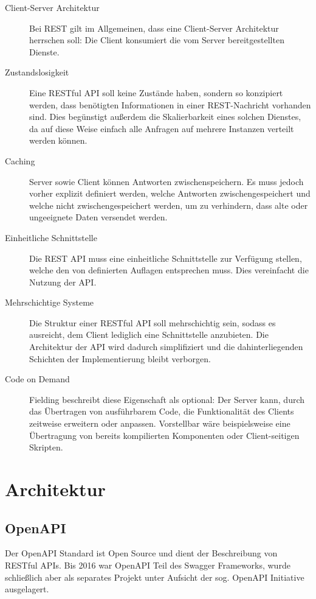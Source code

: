 		\begin{description}
			\item[Client-Server Architektur] 
				Bei REST gilt im Allgemeinen, dass eine Client-Server Architektur herrschen soll: Die Client konsumiert die vom Server bereitgestellten Dienste. 
			\item[Zustandslosigkeit] 
				Eine RESTful API soll keine Zustände haben, sondern so konzipiert werden, dass benötigten Informationen in einer REST-Nachricht vorhanden sind. Dies begünstigt außerdem die Skalierbarkeit eines solchen Dienstes, da auf diese Weise einfach alle Anfragen auf mehrere Instanzen verteilt werden können.
			\item[Caching] 
				Server sowie Client können Antworten zwischenspeichern. Es muss jedoch vorher explizit definiert werden, welche Antworten zwischengespeichert und welche nicht zwischengespeichert werden, um zu verhindern, dass alte oder ungeeignete Daten versendet werden.
			\item[Einheitliche Schnittstelle]
				Die REST API muss eine einheitliche Schnittstelle zur Verfügung stellen, welche den von \cite{RoyThomasFielding.2000} definierten Auflagen entsprechen muss. Dies vereinfacht die Nutzung der API.
			\item[Mehrschichtige Systeme]
				 Die Struktur einer RESTful API soll mehrschichtig sein, sodass es ausreicht, dem Client lediglich eine Schnittstelle anzubieten. Die Architektur der API wird dadurch simplifiziert und die dahinterliegenden Schichten der Implementierung bleibt verborgen.
			\item[Code on Demand] 
				Fielding beschreibt diese Eigenschaft als optional: Der Server kann, durch das Übertragen von ausführbarem Code, die Funktionalität des Clients zeitweise erweitern oder anpassen. Vorstellbar wäre beispielsweise eine Übertragung von bereits kompilierten Komponenten oder Client-seitigen Skripten. 
				
		\end{description}

	\section{Architektur}
	
		\subsection{OpenAPI}
		
			Der OpenAPI Standard ist Open Source und dient der Beschreibung von RESTful APIs. Bis 2016 war OpenAPI Teil des Swagger Frameworks, wurde schließlich aber als separates Projekt unter Aufsicht der sog. OpenAPI Initiative ausgelagert. 
			
